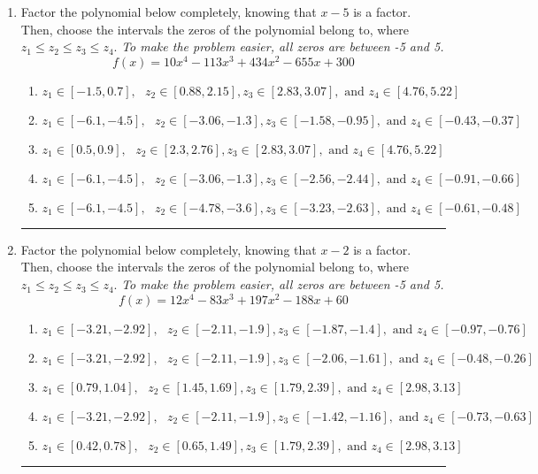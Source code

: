 \documentclass[14pt]{extbook}
\newcommand{\litem}[1]{\item#1\hspace*{-1cm}\rule{\textwidth}{0.4pt}}
\begin{document}
\begin{enumerate}
{\begin{enumerate}[label=\Alph*.]
\end{enumerate} }
\litem{
Factor the polynomial below completely, knowing that $x -5$ is a factor. Then, choose the intervals the zeros of the polynomial belong to, where $z_1 \leq z_2 \leq z_3 \leq z_4$. \textit{To make the problem easier, all zeros are between -5 and 5.}\[ f(x) = 10x^{4} -113 x^{3} +434 x^{2} -655 x + 300 \]\begin{enumerate}[label=\Alph*.]
\item \( z_1 \in [-1.5, 0.7], \text{   }  z_2 \in [0.88, 2.15], z_3 \in [2.83, 3.07], \text{   and   } z_4 \in [4.76, 5.22] \)
\item \( z_1 \in [-6.1, -4.5], \text{   }  z_2 \in [-3.06, -1.3], z_3 \in [-1.58, -0.95], \text{   and   } z_4 \in [-0.43, -0.37] \)
\item \( z_1 \in [0.5, 0.9], \text{   }  z_2 \in [2.3, 2.76], z_3 \in [2.83, 3.07], \text{   and   } z_4 \in [4.76, 5.22] \)
\item \( z_1 \in [-6.1, -4.5], \text{   }  z_2 \in [-3.06, -1.3], z_3 \in [-2.56, -2.44], \text{   and   } z_4 \in [-0.91, -0.66] \)
\item \( z_1 \in [-6.1, -4.5], \text{   }  z_2 \in [-4.78, -3.6], z_3 \in [-3.23, -2.63], \text{   and   } z_4 \in [-0.61, -0.48] \)

\end{enumerate} }
\litem{
Factor the polynomial below completely, knowing that $x -2$ is a factor. Then, choose the intervals the zeros of the polynomial belong to, where $z_1 \leq z_2 \leq z_3 \leq z_4$. \textit{To make the problem easier, all zeros are between -5 and 5.}\[ f(x) = 12x^{4} -83 x^{3} +197 x^{2} -188 x + 60 \]\begin{enumerate}[label=\Alph*.]
\item \( z_1 \in [-3.21, -2.92], \text{   }  z_2 \in [-2.11, -1.9], z_3 \in [-1.87, -1.4], \text{   and   } z_4 \in [-0.97, -0.76] \)
\item \( z_1 \in [-3.21, -2.92], \text{   }  z_2 \in [-2.11, -1.9], z_3 \in [-2.06, -1.61], \text{   and   } z_4 \in [-0.48, -0.26] \)
\item \( z_1 \in [0.79, 1.04], \text{   }  z_2 \in [1.45, 1.69], z_3 \in [1.79, 2.39], \text{   and   } z_4 \in [2.98, 3.13] \)
\item \( z_1 \in [-3.21, -2.92], \text{   }  z_2 \in [-2.11, -1.9], z_3 \in [-1.42, -1.16], \text{   and   } z_4 \in [-0.73, -0.63] \)
\item \( z_1 \in [0.42, 0.78], \text{   }  z_2 \in [0.65, 1.49], z_3 \in [1.79, 2.39], \text{   and   } z_4 \in [2.98, 3.13] \)


\end{enumerate}}
\end{enumerate}
\end{document}
